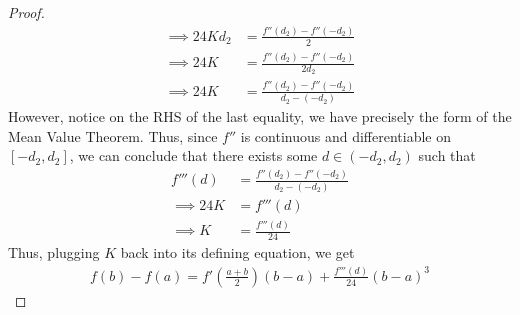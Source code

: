 \documentclass[10pt,a4paper]{article}
\theoremstyle{definition}
\theoremstyle{definition}
\numberwithin{equation}{section}
\begin{document}
\begin{proof}
\begin{align*}
\implies 24Kd_2 &= \frac{f''(d_2) - f''(-d_2)}{2}\\
\implies 24K &= \frac{f''(d_2) - f''(-d_2)}{2d_2}\\
\implies 24K &= \frac{f''(d_2) - f''(-d_2)}{d_2 - (-d_2)}
\end{align*}
However, notice on the RHS of the last equality, we have precisely the form of the Mean Value Theorem. Thus, since $f''$ is continuous and differentiable on $[-d_2, d_2]$, we can conclude that there exists some $d \in (-d_2, d_2)$ such that 
\begin{align*}
f'''(d) &= \frac{f''(d_2) - f''(-d_2)}{d_2 - (-d_2)}\\
\implies 24K &= f'''(d)\\
\implies K &= \frac{f'''(d)}{24}
\end{align*}
Thus, plugging $K$ back into its defining equation, we get
\begin{align*}
f(b) - f(a) = f'\left(\frac{a + b}{2}\right)(b - a) + \frac{f'''(d)}{24}(b - a)^3
\end{align*}
\end{proof}
\end{document}
